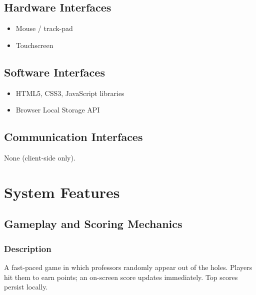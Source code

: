 \documentclass[11pt]{scrreprt}
\begin{document}
\section{Hardware Interfaces}
\begin{itemize}
  \item Mouse / track-pad
  \item Touchscreen
\end{itemize}

\section{Software Interfaces}
\begin{itemize}
  \item HTML5, CSS3, JavaScript libraries
  \item Browser Local Storage API
\end{itemize}

\section{Communication Interfaces}
None (client-side only).

\chapter{System Features}

\section{Gameplay and Scoring Mechanics}

\subsection{Description}
A fast-paced game in which professors randomly appear out of the holes. Players hit them to earn points; an on-screen score updates immediately. Top scores persist locally.
\end{document}
